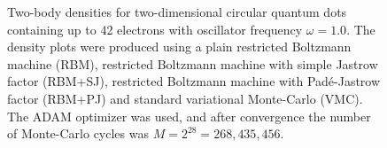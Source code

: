 \begin{landscape}
\begin{figure} [H]
		\caption{Two-body densities for two-dimensional circular quantum dots containing up to 42 electrons with oscillator frequency $\omega=1.0$. The density plots were produced using a plain restricted Boltzmann machine (RBM), restricted Boltzmann machine with simple Jastrow factor (RBM+SJ), restricted Boltzmann machine with Padé-Jastrow factor (RBM+PJ) and standard variational Monte-Carlo (VMC). The  ADAM optimizer was used, and after convergence the number of Monte-Carlo cycles was $M=2^{28}=268,435,456$.}%
		\label{fig:TB_2D_1p0w}
	\end{figure}
\end{landscape}

